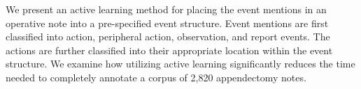 We present an active learning method for placing the event mentions in an operative note into a pre-specified event structure.  Event mentions are first classified into action, peripheral action, observation, and report events.  The actions are further classified into their appropriate location within the event structure.  We examine how utilizing active learning significantly reduces the time needed to completely annotate a corpus of 2,820 appendectomy notes.
